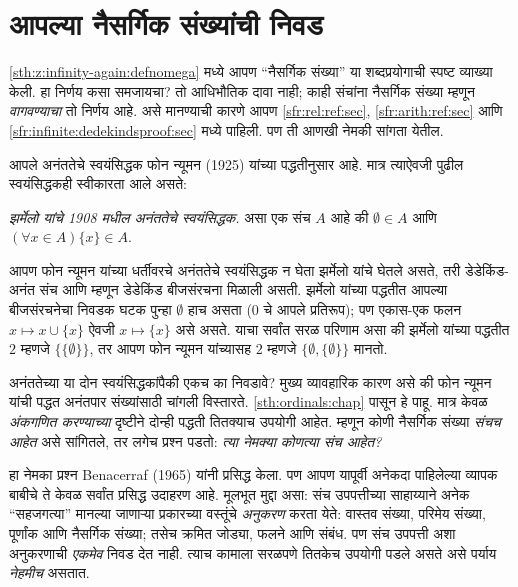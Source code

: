 \section{आपल्या नैसर्गिक संख्यांची निवड}\label{sth:z:nat:sec}





\ref{sth:z:infinity-again:defnomega} मध्ये आपण ``नैसर्गिक संख्या'' या शब्दप्रयोगाची स्पष्ट व्याख्या केली. हा निर्णय कसा समजायचा? तो आधिभौतिक दावा नाही; काही संचांना नैसर्गिक संख्या म्हणून \emph{वागवण्याचा} तो निर्णय आहे. असे मानण्याची कारणे आपण \ref{sfr:rel:ref:sec}, \ref{sfr:arith:ref:sec} आणि \ref{sfr:infinite:dedekindsproof:sec} मध्ये पाहिली. पण ती आणखी नेमकी सांगता येतील.

आपले अनंततेचे स्वयंसिद्धक फोन न्यूमन (1925) यांच्या पद्धतीनुसार आहे. मात्र त्याऐवजी पुढील स्वयंसिद्धकही स्वीकारता आले असते:

\begin{defish}
\emph{झर्मेलो यांचे 1908 मधील अनंततेचे स्वयंसिद्धक.} असा एक संच $A$ आहे की $\emptyset \in A$ आणि $(\forall x \in A)\{x\} \in A$.
\end{defish}

आपण फोन न्यूमन यांच्या धर्तीवरचे अनंततेचे स्वयंसिद्धक न घेता झर्मेलो यांचे घेतले असते, तरी डेडेकिंड-अनंत संच आणि म्हणून डेडेकिंड बीजसंरचना मिळाली असती. झर्मेलो यांच्या पद्धतीत आपल्या बीजसंरचनेचा निवडक घटक पुन्हा $\emptyset$ हाच असता ($0$ चे आपले प्रतिरूप); पण एकास-एक फलन $x \mapsto x \cup \{x\}$ ऐवजी $x \mapsto \{x\}$ असे असते. याचा सर्वांत सरळ परिणाम असा की झर्मेलो यांच्या पद्धतीत $2$ म्हणजे $\{\{\emptyset\}\}$, तर आपण फोन न्यूमन यांच्यासह $2$ म्हणजे $\{\emptyset, \{\emptyset\}\}$ मानतो.

अनंततेच्या या दोन स्वयंसिद्धकांपैकी एकच का निवडावे? मुख्य व्यावहारिक कारण असे की फोन न्यूमन यांची पद्धत अनंतपार संख्यांसाठी चांगली विस्तारते. \ref{sth:ordinals:chap} पासून हे पाहू. मात्र केवळ \emph{अंकगणित करण्याच्या} दृष्टीने दोन्ही पद्धती तितक्याच उपयोगी आहेत. म्हणून कोणी नैसर्गिक संख्या \emph{संचच आहेत} असे सांगितले, तर लगेच प्रश्न पडतो: \emph{त्या नेमक्या कोणत्या संच आहेत?}

हा नेमका प्रश्न Benacerraf (1965) यांनी प्रसिद्ध केला. पण आपण यापूर्वी अनेकदा पाहिलेल्या व्यापक बाबीचे ते केवळ सर्वांत प्रसिद्ध उदाहरण आहे. मूलभूत मुद्दा असा: संच उपपत्तीच्या साहाय्याने अनेक ``सहजगत्या'' मानल्या जाणाऱ्या प्रकारच्या वस्तूंचे \emph{अनुकरण} करता येते: वास्तव संख्या, परिमेय संख्या, पूर्णांक आणि नैसर्गिक संख्या; तसेच क्रमित जोड्या, फलने आणि संबंध. पण संच उपपत्ती अशा अनुकरणाची \emph{एकमेव} निवड देत नाही. त्याच कामाला सरळपणे तितकेच उपयोगी पडले असते असे पर्याय \emph{नेहमीच} असतात.







